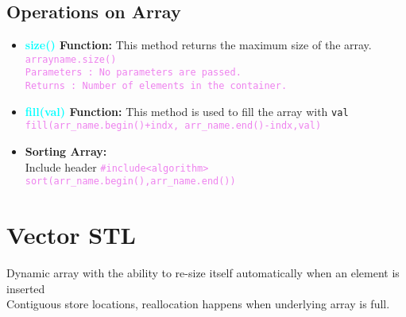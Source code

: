 \subsection{Operations on Array}
\begin{itemize}
	\item \textbf{\textcolor{cyan}{size()} Function:} This method returns the maximum size of the array.\\
	\textcolor{violet}{\texttt{arrayname.size()\\ Parameters : No parameters are passed.\\  Returns : Number of elements in the container.}}
	
	\item \textbf{\textcolor{cyan}{fill(val)} Function:} This method is used to fill the array with \texttt{val}\\ \textcolor{violet}{\texttt{fill(arr\_name.begin()+indx, arr\_name.end()-indx,val)}}
	
	\item \textbf{Sorting Array:} \\ Include header \textcolor{violet}{\texttt{\#include<algorithm>}} \\
	\textcolor{violet}{\texttt{sort(arr\_name.begin(),arr\_name.end())}}
\end{itemize}


\newpage
\section{\textbf{Vector STL}}
Dynamic array with the ability to re-size itself automatically when an element is inserted\\
Contiguous store locations, reallocation happens when underlying array is full.

